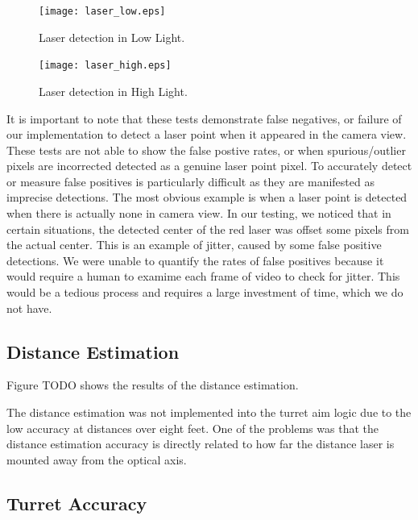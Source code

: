 \documentclass[10pt,twocolumn,letterpaper]{article}
\begin{document}
\begin{figure}[t]
\begin{center}
  \texttt{[image: laser\_low.eps]}
\end{center}
   \caption{Laser detection in Low Light.}
\label{fig:laser_low}
\label{fig:long}
\label{fig:onecol}
\end{figure}

\begin{figure}[t]
\begin{center}
  \texttt{[image: laser\_high.eps]}
\end{center}
   \caption{Laser detection in High Light.}
\label{fig:laser_high}
\label{fig:long}
\label{fig:onecol}
\end{figure}

It is important to note that these tests demonstrate false negatives, or failure of our implementation to detect a laser point when it appeared in the camera view.  These tests are not able to show the false postive rates, or when spurious/outlier pixels are incorrected detected as a genuine laser point pixel.  To accurately detect or measure false positives is particularly difficult as they are manifested as imprecise detections.  The most obvious example is when a laser point is detected when there is actually none in camera view.  In our testing, we noticed that in certain situations, the detected center of the red laser was offset some pixels from the actual center.  This is an example of jitter, caused by some false positive detections.  We were unable to quantify the rates of false positives because it would require a human to examime each frame of video to check for jitter.  This would be a tedious process and requires a large investment of time, which we do not have.

\subsection{Distance Estimation}

Figure TODO shows the results of the distance estimation.

The distance estimation was not implemented into the turret aim logic due to the low accuracy at distances over eight feet. One of the problems was that the distance estimation accuracy is directly related to how far the distance laser is mounted away from the optical axis.  

\subsection{Turret Accuracy}
\end{document}
